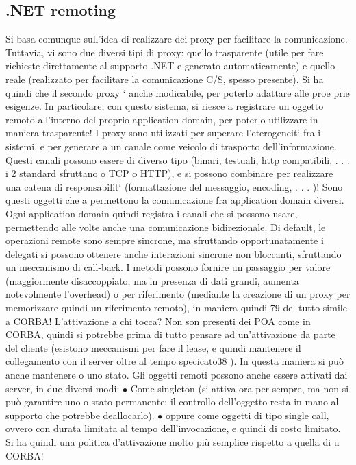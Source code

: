\documentclass[a4paper,12pt]{article}
\begin{document}
\subsection{.NET remoting}
Si basa comunque sull'idea di realizzare dei proxy per facilitare la comunicazione.
Tuttavia, vi sono due diversi tipi di proxy: quello trasparente (utile per fare
richieste direttamente al supporto .NET e generato automaticamente) e quello
reale (realizzato per facilitare la comunicazione C/S, spesso presente). Si ha
quindi che il secondo proxy ` anche modicabile, per poterlo adattare alle proe
prie esigenze. In particolare, con questo sistema, si riesce a registrare un oggetto remoto all'interno del proprio
application domain, per poterlo utilizzare in
maniera trasparente!
I proxy sono utilizzati per superare l'eterogeneit` fra i sistemi, e per generare
a
un canale come veicolo di trasporto dell'informazione. Questi canali possono essere di diverso tipo (binari, testuali,
http compatibili, . . . i 2 standard sfruttano
o TCP o HTTP), e si possono combinare per realizzare una catena di responsabilit` (formattazione del messaggio,
encoding, . . . )! Sono questi oggetti che
a
permettono la comunicazione fra application domain diversi. Ogni application
domain quindi registra i canali che si possono usare, permettendo alle volte anche una comunicazione bidirezionale.
Di default, le operazioni remote sono sempre sincrone, ma sfruttando opportunatamente i delegati si possono ottenere
anche interazioni sincrone non
bloccanti, sfruttando un meccanismo di call-back. I metodi possono fornire un
passaggio per valore (maggiormente disaccoppiato, ma in presenza di dati grandi, aumenta notevolmente l'overhead) o per
riferimento (mediante la creazione
di un proxy per memorizzare quindi un riferimento remoto), in maniera quindi
79
del tutto simile a CORBA!
L'attivazione a chi tocca? Non son presenti dei POA come in CORBA,
quindi si potrebbe prima di tutto pensare ad un'attivazione da parte del cliente
(esistono meccanismi per fare il lease, e quindi mantenere il collegamento con il
server oltre al tempo specicato38 ). In questa maniera si può anche mantenere
o
uno stato.
Gli oggetti remoti possono anche essere attivati dai server, in due diversi
modi:
$\bullet$ Come singleton (si attiva ora per sempre, ma non si può garantire uno
o
stato permanente: il controllo dell'oggetto resta in mano al supporto che
potrebbe deallocarlo).
$\bullet$ oppure come oggetti di tipo single call, ovvero con durata limitata al tempo
dell'invocazione, e quindi di costo limitato.
Si ha quindi una politica d'attivazione molto più semplice rispetto a quella di
u
CORBA!
\end{document}
